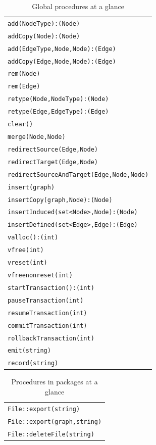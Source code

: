 \begin{table}[htbp]
\centering
\begin{tabular}{|l|}
\hline
\texttt{add(NodeType):(Node)}\\
\texttt{addCopy(Node):(Node)}\\
\texttt{add(EdgeType,Node,Node):(Edge)}\\
\texttt{addCopy(Edge,Node,Node):(Edge)}\\
\texttt{rem(Node)}\\
\texttt{rem(Edge)}\\
\texttt{retype(Node,NodeType):(Node)}\\
\texttt{retype(Edge,EdgeType):(Edge)}\\
\texttt{clear()}\\
\hline
\texttt{merge(Node,Node)}\\
\texttt{redirectSource(Edge,Node)}\\
\texttt{redirectTarget(Edge,Node)}\\
\texttt{redirectSourceAndTarget(Edge,Node,Node)}\\
\hline
\texttt{insert(graph)}\\
\texttt{insertCopy(graph,Node):(Node)}\\
\texttt{insertInduced(set<Node>,Node):(Node)}\\
\texttt{insertDefined(set<Edge>,Edge):(Edge)}\\
\hline
\texttt{valloc():(int)}\\
\texttt{vfree(int)}\\
\texttt{vreset(int)}\\
\texttt{vfreenonreset(int)}\\
\hline
\texttt{startTransaction():(int)}\\
\texttt{pauseTransaction(int)}\\
\texttt{resumeTransaction(int)}\\
\texttt{commitTransaction(int)}\\
\texttt{rollbackTransaction(int)}\\
\hline
\texttt{emit(string)}\\
\texttt{record(string)}\\
\hline
\end{tabular}
\caption{Global procedures at a glance}
\label{procstab}
\end{table}

\begin{table}[htbp]
\centering
\begin{tabular}{|l|}
\hline
\texttt{File::export(string)}\\
\texttt{File::export(graph,string)}\\
\texttt{File::deleteFile(string)}\\
\hline
\end{tabular}
\caption{Procedures in packages at a glance}
\label{packageprocstab}
\end{table}

